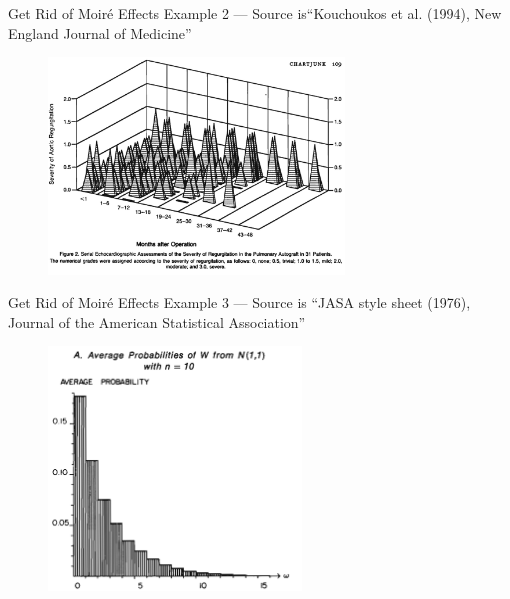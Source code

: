 \documentclass[aspectratio=1610]{beamer}
\begin{document}
\begin{frame}
	{Get Rid of Moir\'e Effects}
	{Example 2 --- Source is``Kouchoukos et al. (1994), New England Journal of Medicine''}
	\centering
	\begin{figure}
		\includegraphics[width=0.7\textwidth]{images/moire_effect_2.png}
	\end{figure}
\end{frame}

\begin{frame}
	{Get Rid of Moir\'e Effects}
	{Example 3 --- Source is ``JASA style sheet (1976), Journal of the American Statistical Association''}
	\centering
	\begin{figure}
		\includegraphics[width=0.6\textwidth]{images/moire_effect_3.png}
	\end{figure}
\end{frame}
\end{document}
